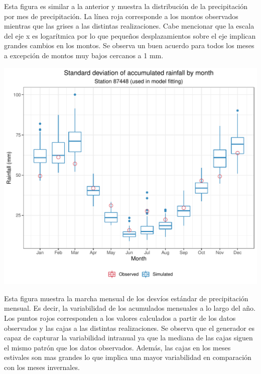 \documentclass[
]{article}
\begin{document}
Esta figura es similar a la anterior y muestra la distribución de la precipitación por mes de precipitación. La línea roja corresponde a los montos observados mientras que las grises a las distintas realizaciones. Cabe mencionar que la escala del eje x es logarítmica por lo que pequeños desplazamientos sobre el eje implican grandes cambios en los montos. Se observa un buen acuerdo para todos los meses a excepción de montos muy bajos cercanos a 1 mm.

\begin{center}\includegraphics{Webinario_Generador_files/figure-latex/unnamed-chunk-38-1} \end{center}

Esta figura muestra la marcha mensual de los desvíos estándar de precipitación mensual. Es decir, la variabilidad de los acumulados mensuales a lo largo del año. Los puntos rojos corresponden a los valores calculados a partir de los datos observados y las cajas a las distintas realizaciones. Se observa que el generador es capaz de capturar la variabilidad intranual ya que la mediana de las cajas siguen el mismo patrón que los datos observados. Además, las cajas en los meses estivales son mas grandes lo que implica una mayor variabilidad en comparación con los meses invernales.
\end{document}
